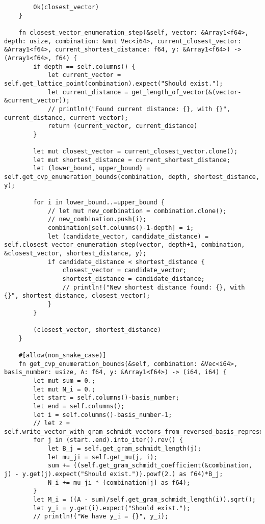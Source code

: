 \begin{verbatim}
        Ok(closest_vector)
    }

    fn closest_vector_enumeration_step(&self, vector: &Array1<f64>, depth: usize, combination: &mut Vec<i64>, current_closest_vector: &Array1<f64>, current_shortest_distance: f64, y: &Array1<f64>) -> (Array1<f64>, f64) {
        if depth == self.columns() {
            let current_vector = self.get_lattice_point(combination).expect("Should exist.");
            let current_distance = get_length_of_vector(&(vector-&current_vector));
            // println!("Found current distance: {}, with {}", current_distance, current_vector);
            return (current_vector, current_distance)
        }
        
        let mut closest_vector = current_closest_vector.clone();
        let mut shortest_distance = current_shortest_distance;
        let (lower_bound, upper_bound) = self.get_cvp_enumeration_bounds(combination, depth, shortest_distance, y);

        for i in lower_bound..=upper_bound {
            // let mut new_combination = combination.clone();
            // new_combination.push(i);
            combination[self.columns()-1-depth] = i;
            let (candidate_vector, candidate_distance) = self.closest_vector_enumeration_step(vector, depth+1, combination, &closest_vector, shortest_distance, y);
            if candidate_distance < shortest_distance {
                closest_vector = candidate_vector;
                shortest_distance = candidate_distance;
                // println!("New shortest distance found: {}, with {}", shortest_distance, closest_vector);
            }            
        }

        (closest_vector, shortest_distance)
    }

    #[allow(non_snake_case)]
    fn get_cvp_enumeration_bounds(&self, combination: &Vec<i64>, basis_number: usize, A: f64, y: &Array1<f64>) -> (i64, i64) {
        let mut sum = 0.;
        let mut N_i = 0.;
        let start = self.columns()-basis_number;
        let end = self.columns();
        let i = self.columns()-basis_number-1;
        // let z = self.write_vector_with_gram_schmidt_vectors_from_reversed_basis_representation(combination);
        for j in (start..end).into_iter().rev() {
            let B_j = self.get_gram_schmidt_length(j);
            let mu_ji = self.get_mu(j, i);
            sum += ((self.get_gram_schmidt_coefficient(&combination, j) - y.get(j).expect("Should exist.")).powf(2.) as f64)*B_j;
            N_i += mu_ji * (combination[j] as f64);
        }
        let M_i = ((A - sum)/self.get_gram_schmidt_length(i)).sqrt();
        let y_i = y.get(i).expect("Should exist.");
        // println!("We have y_i = {}", y_i);


\end{verbatim}
